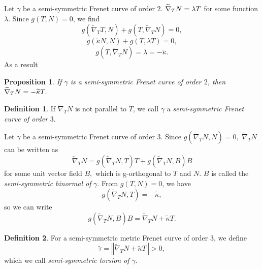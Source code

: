 \documentclass{amsart}
\theoremstyle{plain}
\newtheorem{proposition}{Proposition}
\theoremstyle{definition}
\newtheorem{definition}{Definition}
\theoremstyle{remark}
\numberwithin{equation}{section}
\begin{document}
Let $\gamma $ be a semi-symmetric Frenet curve of order $2$. $\widetilde{%
\nabla }_{T}N=\lambda T$ for some function $\lambda .$ Since $g(T,N)=0$, we
find%
\begin{equation*}
g(\widetilde{\nabla }_{T}T,N)+g\left( T,\widetilde{\nabla }_{T}N\right) =0,
\end{equation*}%
\begin{equation*}
g\left( \widetilde{\kappa }N,N\right) +g\left( T,\lambda T\right) =0,
\end{equation*}%
\begin{equation*}
g\left( T,\widetilde{\nabla }_{T}N\right) =\lambda =-\widetilde{\kappa }.
\end{equation*}%
As a result

\begin{proposition}
If $\gamma $ is a semi-symmetric Frenet curve of order $2$, then $\widetilde{%
\nabla }_{T}N=-\widetilde{\kappa }T.$
\end{proposition}

\begin{definition}
If $\widetilde{\nabla }_{T}N$ is not parallel to $T$, we call $\gamma $ a 
\textit{semi-symmetric Frenet curve of order }$3$.
\end{definition}

Let $\gamma $ be a semi-symmetric Frenet curve of order $3$. Since $g\left( 
\widetilde{\nabla }_{T}N,N\right) =0,$ $\widetilde{\nabla }_{T}N$ can be
written as%
\begin{equation}
\widetilde{\nabla }_{T}N=g\left( \widetilde{\nabla }_{T}N,T\right) T+g\left( 
\widetilde{\nabla }_{T}N,B\right) B  \label{nablaTN1}
\end{equation}%
for some unit vector field $B,$ which is g-orthogonal to $T$ and $N$. $B$ is
called the \textit{semi-symmetric binormal of} $\gamma $. From $g(T,N)=0$,
we have 
\begin{equation*}
g\left( \widetilde{\nabla }_{T}N,T\right) =-\widetilde{\kappa },
\end{equation*}%
so we can write%
\begin{equation*}
g\left( \widetilde{\nabla }_{T}N,B\right) B=\widetilde{\nabla }_{T}N+%
\widetilde{\kappa }T.
\end{equation*}

\begin{definition}
For a semi-symmetric metric Frenet curve of order $3$, we define 
\begin{equation*}
\widetilde{\tau }=\left\Vert \widetilde{\nabla }_{T}N+\widetilde{\kappa }%
T\right\Vert >0,
\end{equation*}%
which we call \textit{semi-symmetric torsion of }$\gamma $.
\end{definition}
\end{document}
